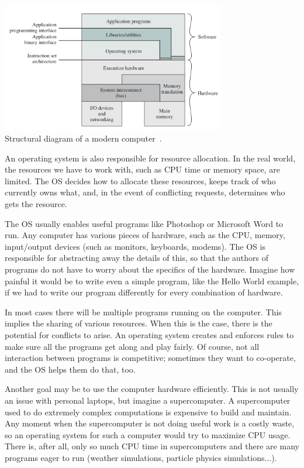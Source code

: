 \begin{center}
\includegraphics[width=0.73\textwidth]{images/os-sw-hw.png}\\
Structural diagram of a modern computer~\cite{osi}.
\end{center}

An operating system is also responsible for resource allocation. In the real world, the resources we have to work with, such as CPU time or memory space, are limited. The OS decides how to allocate these resources, keeps track of who currently owns what, and, in the event of conflicting requests, determines who gets the resource.

The OS usually enables useful programs like Photoshop or Microsoft Word to run. Any computer has various pieces of hardware, such as the CPU, memory, input/output devices (such as monitors, keyboards, modems). The OS is responsible for abstracting away the details of this, so that the authors of programs do not have to worry about the specifics of the hardware. Imagine how painful it would be to write even a simple program, like the Hello World example, if we had to write our program differently for every combination of hardware.

In most cases there will be multiple programs running on the computer. This implies the sharing of various resources. When this is the case, there is the potential for conflicts to arise. An operating system creates and enforces rules to make sure all the programs get along and play fairly. Of course, not all interaction between programs is competitive; sometimes they want to co-operate, and the OS helps them do that, too.

Another goal may be to use the computer hardware efficiently. This is not usually an issue with personal laptops, but imagine a supercomputer. A supercomputer used to do extremely complex computations is expensive to build and maintain. Any moment when the supercomputer is not doing useful work is a costly waste, so an operating system for such a computer would try to maximize CPU usage. There is, after all, only so much CPU time in supercomputers and there are many programs eager to run (weather simulations, particle physics simulations...).

